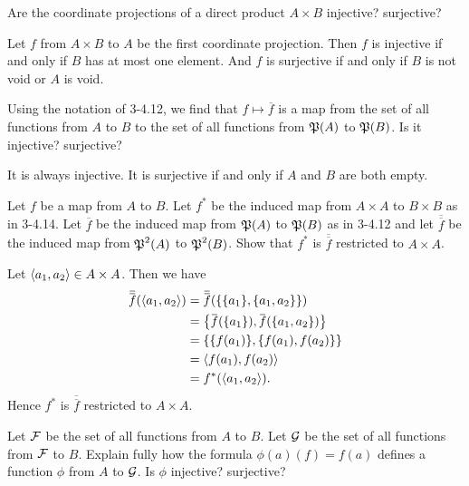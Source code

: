\documentclass{report}
\begin{document}
\begin{exercise}
Are the coordinate projections of a direct product $A\times B$ injective? surjective?
\end{exercise}

\begin{solution}
Let $f$ from $A\times B$ to $A$ be the first coordinate projection.
Then $f$ is injective if and only if $B$ has at most one element.
And $f$ is surjective if and only if $B$ is not void or $A$ is void.
\end{solution}

\begin{exercise}
Using the notation of 3-4.12, we find that $f\mapsto \overbar f$
is a map from the set of all functions
from $A$ to $B$ to the set of all functions from $\operatorname{\mathfrak{P}}(A)$ to $\operatorname{\mathfrak{P}}(B)$.
Is it injective? surjective?
\end{exercise}

\begin{solution}
It is always injective. It is surjective if and only if $A$ and $B$ are both empty.
\end{solution}

\begin{exercise}
Let $f$ be a map from $A$ to $B$. Let $f^*$ be the induced map from $A\times A$ to $B\times B$ as
in 3-4.14. Let $\overbar f$ be the induced map from $\operatorname{\mathfrak{P}}(A)$ to $\operatorname{\mathfrak{P}}(B)$ as in 3-4.12
and let $\overbar{\overbar{f}}$ be the
induced map from $\operatorname{\mathfrak{P}}^2(A)$ to $\operatorname{\mathfrak{P}}^2(B)$.
Show that $f^*$ is $\overbar{\overbar{f}}$ restricted to $A \times A$. 
\end{exercise}

\begin{solution}
Let $\left\langle a_1,a_2\right\rangle\in A\times A$.
Then we have 
\[
\begin{aligned}
\overbar{\overbar{f}}(\aprn{a_1,a_2})
&=\overbar{\overbar{f}}(\set{\set{a_1},\set{a_1,a_2}})\\
&=\set{\overbar{f}(\set{a_1}), \overbar{f}(\set{a_1,a_2})}\\
&=\set{\set{f(a_1)}, \set{f(a_1),f(a_2)}}\\
&=\aprn{f(a_1),f(a_2)}\\
&=f^*(\aprn{a_1,a_2}).
\end{aligned}
\]
Hence $f^*$ is $\overbar{\overbar{f}}$ restricted to $A \times A$.
\end{solution}

\begin{exercise}
Let $\mathcal{F}$ be the set of all functions from $A$ to $B$.
Let $\mathcal{G}$ be the set of all functions from
$\mathcal{F}$ to $B$. Explain fully how the formula $\phi(a)(f)=f(a)$
defines a function $\phi$ from $A$ to $\mathcal{G}$.
Is $\phi$ injective? surjective?
\end{exercise}
\end{document}
